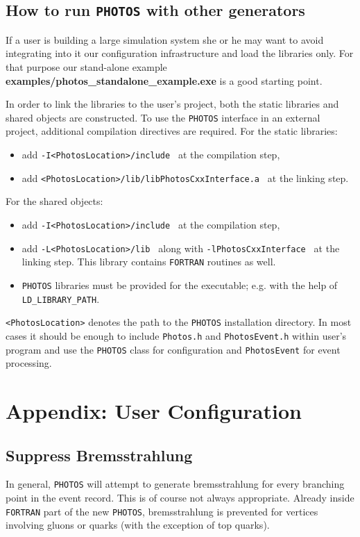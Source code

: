 \documentclass[]{Photos_interface_design}
\begin{document}
\subsection{How to run {\tt PHOTOS} with other generators}
If a user is building a large simulation system she or he may want to avoid
integrating into it our configuration infrastructure and load the libraries only. 
For that purpose our stand-alone 
example {\bf examples/photos\_standalone\_example.exe} is a good starting point.

In order to link the libraries to the user's project, both the static libraries and shared objects are
constructed. To use the {\tt PHOTOS} interface in an external project, additional 
compilation directives are required. For the static libraries:
\begin{itemize}
  \item add {\tt -I<PhotosLocation>/include } at the compilation step,
  \item add {\tt <PhotosLocation>/lib/libPhotosCxxInterface.a } at the linking step.
\end{itemize}
For the shared objects:
\begin{itemize}
  \item add {\tt -I<PhotosLocation>/include } at the compilation step,
  \item add {\tt -L<PhotosLocation>/lib } along with {\tt -lPhotosCxxInterface } at the linking step.
        This library contains {\tt FORTRAN} routines as well.
  \item  {\tt PHOTOS} libraries must be provided for the executable; e.g. with the help of {\tt LD\_LIBRARY\_PATH}.
\end{itemize}
{\tt <PhotosLocation>} denotes the path to the {\tt PHOTOS} installation directory.
In most cases it should be enough to include {\tt Photos.h} and {\tt PhotosEvent.h}
within user's program and use the {\tt PHOTOS} class for configuration and {\tt PhotosEvent}
for event processing.

\section{Appendix: User Configuration}
\label{sec:User Configuration}

\subsection{Suppress Bremsstrahlung}
\label{section:suppress}

In general, {\tt PHOTOS} will attempt to generate bremsstrahlung for every 
branching point in the event record. This is of course not always appropriate.
Already inside {\tt FORTRAN} part of the new {\tt PHOTOS}, bremsstrahlung is prevented for vertices involving gluons or quarks 
(with the exception of top quarks).
\end{document}

